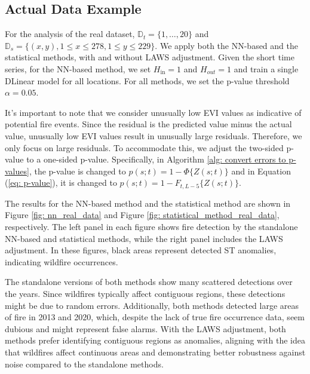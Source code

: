 \documentclass[11pt]{article}
\begin{document}
\subsection{Actual Data Example}
For the analysis of the real dataset, $\mathbb{D}_t=\{1, \ldots, 20\}$ and $\mathbb{D}_s=\{(x, y), 1 \leq x \leq 278, 1 \leq y \leq 229\}$. We apply both the NN-based and the statistical methods, with and without LAWS adjustment. Given the short time series, for the NN-based method, we set $H_{\mathrm{in}}=1$ and $H_{out}=1$ and train a single DLinear model for all locations. For all methods, we set the p-value threshold $\alpha=0.05$.

 It's important to note that we consider unusually low EVI values as indicative of potential fire events. Since the residual is the predicted value minus the actual value, unusually low EVI values result in unusually large residuals. Therefore, we only focus on large residuals. To accommodate this, we adjust the two-sided p-value to a one-sided p-value. Specifically, in Algorithm \ref{alg: convert errors to p-values}, the p-value is changed to $p(s;t)= 1-\Phi\{Z(s;t)\}$ and in Equation (\ref{eq: p-value}), it is changed to $p(s;t)= 1-F_{t,L-5}\{Z(s;t)\}$.




The results for the NN-based method and the statistical method are shown in Figure \ref{fig: nn_real_data} and Figure \ref{fig: statistical_method_real_data}, respectively. The left panel in each figure shows fire detection by the standalone NN-based and statistical methods, while the right panel includes the LAWS adjustment. In these figures, black areas represent detected ST anomalies, indicating wildfire occurrences.

The standalone versions of both methods show many scattered detections over the years. Since wildfires typically affect contiguous regions, these detections might be due to random errors. Additionally, both methods detected large areas of fire in 2013 and 2020, which, despite the lack of true fire occurrence data, seem dubious and might represent false alarms. With the LAWS adjustment, both methods prefer identifying contiguous regions as anomalies, aligning with the idea that wildfires affect continuous areas and demonstrating better robustness against noise compared to the standalone methods.
\end{document}
